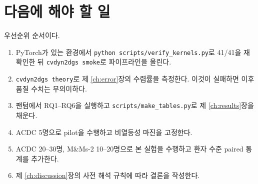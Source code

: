 \section{다음에 해야 할 일}

우선순위 순서이다.

\begin{enumerate}[leftmargin=2em]
  \item PyTorch가 있는 환경에서 \texttt{python scripts/verify\_kernels.py}로 41/41을
  재확인한 뒤 \texttt{cvdyn2dgs smoke}로 파이프라인을 올린다.
  \item \texttt{cvdyn2dgs theory}로 제 \ref{ch:error}장의 수렴률을 측정한다. 이것이
  실패하면 이후 품질 수치는 무의미하다.
  \item 팬텀에서 RQ1--RQ6을 실행하고 \texttt{scripts/make\_tables.py}로 제
  \ref{ch:results}장을 채운다.
  \item ACDC 5명으로 pilot을 수행하고 비열등성 마진을 고정한다.
  \item ACDC 20--30명, M\&Ms-2 10--20명으로 본 실험을 수행하고 환자 수준 paired 통계를
  추가한다.
  \item 제 \ref{ch:discussion}장의 사전 해석 규칙에 따라 결론을 작성한다.
\end{enumerate}
